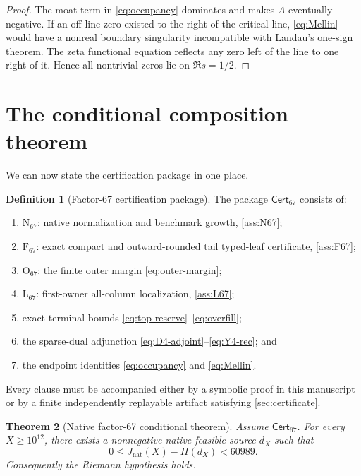 \documentclass[11pt]{article}
\newtheorem{theorem}{Theorem}[section]
\theoremstyle{definition}
\newtheorem{definition}[theorem]{Definition}
\theoremstyle{remark}
\newcommand{\1}{\mathbf 1}
\newcommand{\Cert}{\mathsf{Cert}_{67}}
\newcommand{\Nat}{\mathrm{nat}}
\begin{document}
\begin{proof}
The moat term in \eqref{eq:occupancy} dominates and makes \(A\) eventually negative.  If an off-line zero existed to the right of the critical line, \eqref{eq:Mellin} would have a nonreal boundary singularity incompatible with Landau's one-sign theorem.  The zeta functional equation reflects any zero left of the line to one right of it.  Hence all nontrivial zeros lie on \(\Re s=1/2\).
\end{proof}

\section{The conditional composition theorem}\label{sec:composition}

We can now state the certification package in one place.

\begin{definition}[Factor-67 certification package]\label{def:cert}
The package \(\Cert\) consists of:
\begin{enumerate}[label=\textup{(\Alph*)}]
\item \(\mathrm N_{67}\): native normalization and benchmark growth, \cref{ass:N67};
\item \(\mathrm F_{67}\): exact compact and outward-rounded tail typed-leaf certificate, \cref{ass:F67};
\item \(\mathrm O_{67}\): the finite outer margin \eqref{eq:outer-margin};
\item \(\mathrm L_{67}\): first-owner all-column localization, \cref{ass:L67};
\item exact terminal bounds \eqref{eq:top-reserve}--\eqref{eq:overfill};
\item the sparse-dual adjunction \eqref{eq:D4-adjoint}--\eqref{eq:Y4-rec}; and
\item the endpoint identities \eqref{eq:occupancy} and \eqref{eq:Mellin}.
\end{enumerate}
Every clause must be accompanied either by a symbolic proof in this manuscript or by a finite independently replayable artifact satisfying \cref{sec:certificate}.
\end{definition}

\begin{theorem}[Native factor-67 conditional theorem]\label{thm:main}
Assume \(\Cert\).  For every \(X\ge10^{12}\), there exists a nonnegative native-feasible source \(d_X\) such that
\begin{equation}\label{eq:main-bound}
0\le J_{\Nat}(X)-H(d_X)<60989.
\end{equation}
Consequently the Riemann hypothesis holds.
\end{theorem}
\end{document}
